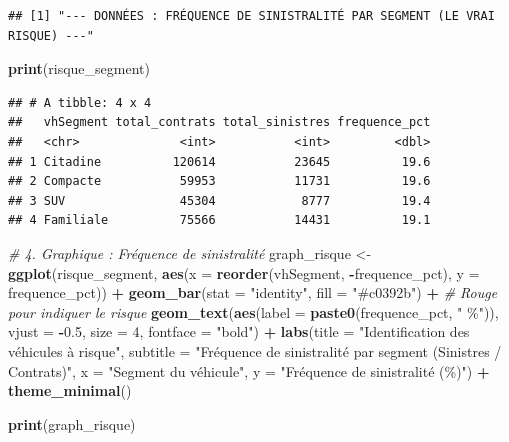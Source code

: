 \documentclass[
]{article}
\newenvironment{Shaded}{\begin{snugshade}}{\end{snugshade}}
\newcommand{\AttributeTok}[1]{\textcolor[rgb]{0.13,0.29,0.53}{#1}}
\newcommand{\CommentTok}[1]{\textcolor[rgb]{0.56,0.35,0.01}{\textit{#1}}}
\newcommand{\DecValTok}[1]{\textcolor[rgb]{0.00,0.00,0.81}{#1}}
\newcommand{\FloatTok}[1]{\textcolor[rgb]{0.00,0.00,0.81}{#1}}
\newcommand{\FunctionTok}[1]{\textcolor[rgb]{0.13,0.29,0.53}{\textbf{#1}}}
\newcommand{\NormalTok}[1]{#1}
\newcommand{\OtherTok}[1]{\textcolor[rgb]{0.56,0.35,0.01}{#1}}
\newcommand{\SpecialCharTok}[1]{\textcolor[rgb]{0.81,0.36,0.00}{\textbf{#1}}}
\newcommand{\StringTok}[1]{\textcolor[rgb]{0.31,0.60,0.02}{#1}}
\begin{document}
\begin{verbatim}
## [1] "--- DONNÉES : FRÉQUENCE DE SINISTRALITÉ PAR SEGMENT (LE VRAI RISQUE) ---"
\end{verbatim}

\begin{Shaded}
\begin{Highlighting}[]
\FunctionTok{print}\NormalTok{(risque\_segment)}
\end{Highlighting}
\end{Shaded}

\begin{verbatim}
## # A tibble: 4 x 4
##   vhSegment total_contrats total_sinistres frequence_pct
##   <chr>              <int>           <int>         <dbl>
## 1 Citadine          120614           23645          19.6
## 2 Compacte           59953           11731          19.6
## 3 SUV                45304            8777          19.4
## 4 Familiale          75566           14431          19.1
\end{verbatim}

\begin{Shaded}
\begin{Highlighting}[]
\CommentTok{\# 4. Graphique : Fréquence de sinistralité}
\NormalTok{graph\_risque }\OtherTok{\textless{}{-}} \FunctionTok{ggplot}\NormalTok{(risque\_segment, }\FunctionTok{aes}\NormalTok{(}\AttributeTok{x =} \FunctionTok{reorder}\NormalTok{(vhSegment, }\SpecialCharTok{{-}}\NormalTok{frequence\_pct), }\AttributeTok{y =}\NormalTok{ frequence\_pct)) }\SpecialCharTok{+}
  \FunctionTok{geom\_bar}\NormalTok{(}\AttributeTok{stat =} \StringTok{"identity"}\NormalTok{, }\AttributeTok{fill =} \StringTok{"\#c0392b"}\NormalTok{) }\SpecialCharTok{+} \CommentTok{\# Rouge pour indiquer le risque}
  \FunctionTok{geom\_text}\NormalTok{(}\FunctionTok{aes}\NormalTok{(}\AttributeTok{label =} \FunctionTok{paste0}\NormalTok{(frequence\_pct, }\StringTok{" \%"}\NormalTok{)), }\AttributeTok{vjust =} \SpecialCharTok{{-}}\FloatTok{0.5}\NormalTok{, }\AttributeTok{size =} \DecValTok{4}\NormalTok{, }\AttributeTok{fontface =} \StringTok{"bold"}\NormalTok{) }\SpecialCharTok{+}
  \FunctionTok{labs}\NormalTok{(}\AttributeTok{title =} \StringTok{"Identification des véhicules à risque"}\NormalTok{,}
       \AttributeTok{subtitle =} \StringTok{"Fréquence de sinistralité par segment (Sinistres / Contrats)"}\NormalTok{,}
       \AttributeTok{x =} \StringTok{"Segment du véhicule"}\NormalTok{,}
       \AttributeTok{y =} \StringTok{"Fréquence de sinistralité (\%)"}\NormalTok{) }\SpecialCharTok{+}
  \FunctionTok{theme\_minimal}\NormalTok{()}

\FunctionTok{print}\NormalTok{(graph\_risque)}
\end{Highlighting}
\end{Shaded}
\end{document}
